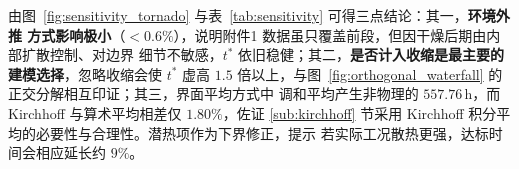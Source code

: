 由图~\ref{fig:sensitivity_tornado} 与表~\ref{tab:sensitivity} 可得三点结论：其一，\textbf{环境外推
方式影响极小}（$<0.6\%$），说明附件1 数据虽只覆盖前段，但因干燥后期由内部扩散控制、对边界
细节不敏感，$t^*$ 依旧稳健；其二，\textbf{是否计入收缩是最主要的建模选择}，忽略收缩会使 $t^*$
虚高 $1.5$ 倍以上，与图~\ref{fig:orthogonal_waterfall} 的正交分解相互印证；其三，界面平均方式中
调和平均产生非物理的 $557.76\,\mathrm{h}$，而 Kirchhoff 与算术平均相差仅 $1.80\%$，佐证
\ref{sub:kirchhoff} 节采用 Kirchhoff 积分平均的必要性与合理性。潜热项作为下界修正，提示
若实际工况散热更强，达标时间会相应延长约 $9\%$。
